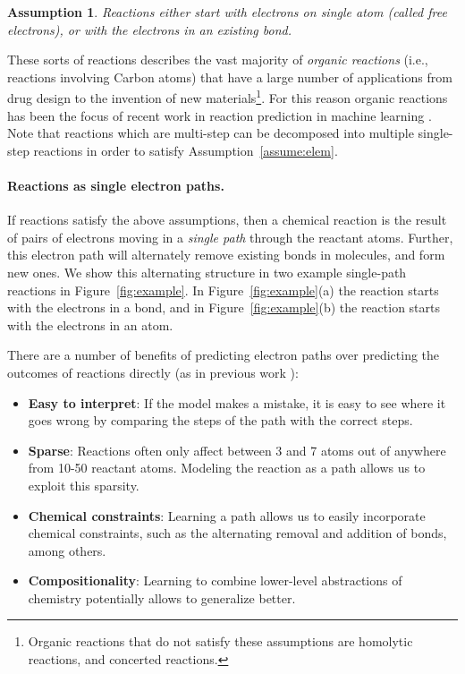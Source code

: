 \documentclass{article}
\newtheorem{assumption}{Assumption}
\begin{document}
\begin{assumption}
Reactions either start with electrons on single atom (called \emph{free electrons}), or with the electrons in an existing bond.
\label{assume:atom_bond}
\end{assumption}

These sorts of reactions describes the vast majority of \emph{organic reactions} (i.e., reactions involving Carbon atoms) that have a large number of applications from drug design to the invention of new materials\footnote{Organic reactions that do not satisfy these assumptions are homolytic reactions, and concerted reactions.}. For this reason organic reactions has been the focus of recent work in reaction prediction in machine learning \cite{jin2017predicting,schwaller2017found}. Note that reactions which are multi-step can be decomposed into multiple single-step reactions in order to satisfy Assumption~\ref{assume:elem}.


\paragraph{Reactions as single electron paths.}
If reactions satisfy the above assumptions, then a chemical reaction is the result of pairs of electrons moving in a \emph{single path} through the reactant atoms. Further, this electron path will alternately remove existing bonds in molecules, and form new ones. We show this alternating structure in two example single-path reactions in Figure~\ref{fig:example}. In Figure~\ref{fig:example}(a) the reaction starts with the electrons in a bond, and in Figure~\ref{fig:example}(b) the reaction starts with the electrons in an atom. 

There are a number of benefits of predicting electron paths over predicting the outcomes of reactions directly (as in previous work \cite{jin2017predicting,schwaller2017found}):
\begin{itemize}
\item \textbf{Easy to interpret}: If the model makes a mistake, it is easy to see where it goes wrong by comparing the steps of the path with the correct steps.
\item \textbf{Sparse}: Reactions often only affect between 3 and 7 atoms out of anywhere from 10-50 reactant atoms. Modeling the reaction as a path allows us to exploit this sparsity.
\item \textbf{Chemical constraints}: Learning a path allows us to easily incorporate chemical constraints, such as the alternating removal and addition of bonds, among others.
\item \textbf{Compositionality}: Learning to combine lower-level abstractions of chemistry potentially allows to generalize better.
\end{itemize}
\end{document}
